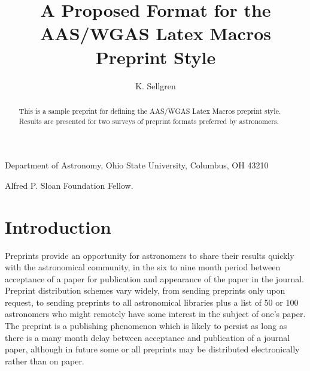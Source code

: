 %






\title
{A Proposed Format for the AAS/WGAS Latex Macros Preprint Style}

\author
{K. Sellgren}

\affil
{Department of Astronomy, Ohio State University, Columbus, OH  43210}

{Alfred P. Sloan Foundation Fellow.}


\begin{abstract}
This is a sample preprint for defining the AAS/WGAS Latex Macros preprint 
style.  Results are presented for two surveys of preprint formats preferred 
by astronomers.
\end{abstract}


\section
{Introduction}

Preprints provide an opportunity for astronomers to share their results 
quickly with the astronomical community, in the six to nine month period 
between acceptance of a paper for publication and appearance of the paper 
in the journal.  Preprint distribution schemes vary widely, from sending 
preprints only upon request, to sending preprints to all astronomical
libraries plus a list of 50 or 100 astronomers who might remotely have
some interest in the subject of one's paper.  The preprint is a publishing 
phenomenon which is likely to persist as long as there is a many month 
delay between acceptance and publication of a journal paper, although in 
future some or all preprints may be distributed electronically rather than 
on paper.

